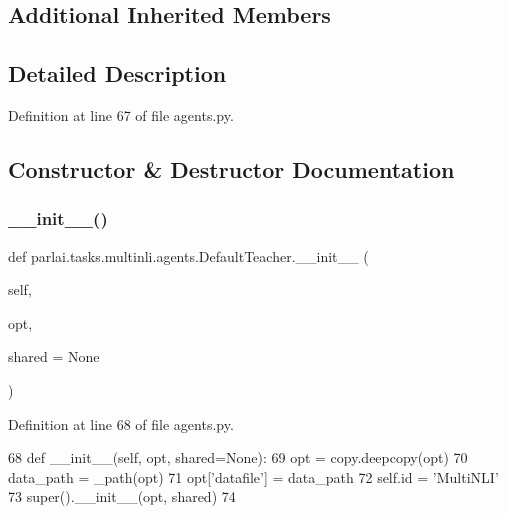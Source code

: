 \subsection*{Additional Inherited Members}


\subsection{Detailed Description}


Definition at line 67 of file agents.\+py.



\subsection{Constructor \& Destructor Documentation}
\mbox{\label{classparlai_1_1tasks_1_1multinli_1_1agents_1_1DefaultTeacher_adea80f320b99b2e8402ecff209961365}} 
\subsubsection{\texorpdfstring{\+\_\+\+\_\+init\+\_\+\+\_\+()}{\_\_init\_\_()}}
{\footnotesize\ttfamily def parlai.\+tasks.\+multinli.\+agents.\+Default\+Teacher.\+\_\+\+\_\+init\+\_\+\+\_\+ (\begin{DoxyParamCaption}\item[{}]{self,  }\item[{}]{opt,  }\item[{}]{shared = {\ttfamily None} }\end{DoxyParamCaption})}



Definition at line 68 of file agents.\+py.


\begin{DoxyCode}
68     \textcolor{keyword}{def }\_\_init\_\_(self, opt, shared=None):
69         opt = copy.deepcopy(opt)
70         data\_path = \_path(opt)
71         opt[\textcolor{stringliteral}{'datafile'}] = data\_path
72         self.id = \textcolor{stringliteral}{'MultiNLI'}
73         super().\_\_init\_\_(opt, shared)
74 
\end{DoxyCode}


